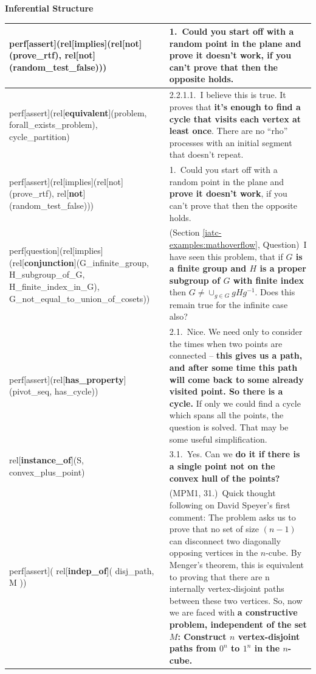 \documentclass[smallextended,oneside]{svjour3}       %
\begin{document}
{\newpage

{\centering
\textbf{Inferential Structure}  

\par}

\medskip

\noindent
\noindent\begin{tabular}{|p{}|p{}|}
\hline
perf[assert](rel[\textbf{implies}](rel[not](prove_rtf), rel[not](random_test_false))) & 1.~Could you start off with a random point in the plane and prove it doesn't work, \textbf{if you can't prove that then the opposite holds.}\\ \hline
perf[assert](rel[\textbf{equivalent}](problem, forall_exists_problem), cycle_partition) & 2.2.1.1.~I believe this is true. It proves that \textbf{it's enough to find a cycle that visits each vertex at least once}. There are no ``rho'' processes with an initial segment that doesn't repeat.\\ \hline
perf[assert](rel[implies](rel[not](prove_rtf), rel[\textbf{not}](random_test_false))) & 1.~Could you start off with a random point in the plane and \textbf{prove it doesn't work}, if you can't prove that then the opposite holds.\\ \hline
perf[question](rel[implies](rel[\textbf{conjunction}](G_infinite_group, H_subgroup_of_G, H_finite_index_in_G), G_not_equal_to_union_of_cosets)) & (Section \ref{iatc-examples:mathoverflow}, Question)~I have seen this problem, that if \textbf{$G$
is a finite group and $H$ is a proper subgroup of $G$ with finite index} then $ G \neq \cup_{g \in G} gHg^{-1}$. Does this remain true for the infinite case also? \\ \hline
 perf[assert](rel[\textbf{has_property}](pivot_seq, has_cycle)) & 2.1.~Nice. We need only to consider the times when two points are connected -- \textbf{this gives us a path, and after some time this path will come back to some already visited point. So there is a cycle.} If only we could find a cycle which spans all the points, the question is solved. That may be some useful simplification.\\ \hline
rel[\textbf{instance_of}](S, convex_plus_point) & 3.1.~Yes. Can we \textbf{do it if there is a single point not on the convex hull of the points?}\\ \hline
perf[assert]( rel[\textbf{indep_of}]( disj_path, M )) & (MPM1, 31.)~Quick thought following on David Speyer's first comment:  The problem asks us to prove that no set of size $(n-1)$ can disconnect two diagonally opposing vertices in the $n$-cube.  By Menger's theorem, this is equivalent to proving that there are n internally vertex-disjoint paths between these two vertices.  So, now we are faced with \textbf{a constructive problem, independent of the set $M$:  Construct $n$ vertex-disjoint paths from $0^n$ to $1^n$ in the $n$-cube.}\\ \hline

\end{tabular}}
\end{document}

